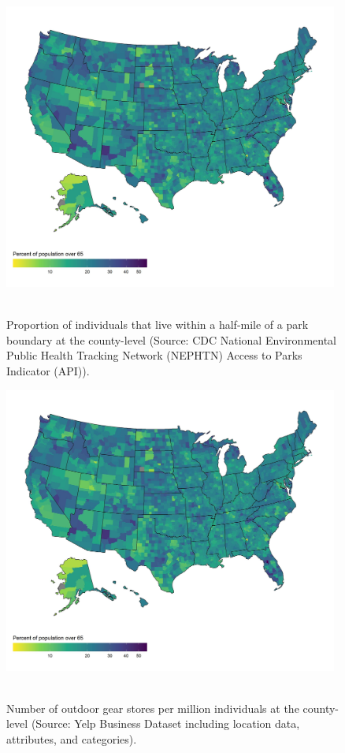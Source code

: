 \documentclass{article}
\begin{document}
\begin{figure}[!h] 
    \centering
    \caption{Proportion of individuals that live within a half-mile of a park boundary at the county-level (Source: CDC National Environmental Public Health Tracking Network (NEPHTN) Access to Parks Indicator (API)).}
    \includegraphics[width=11cm]{figures/univariate/figU05_api.jpg}
    \
\end{figure}
\FloatBarrier

\begin{figure}[!h] 
    \centering
    \caption{Number of outdoor gear stores per million individuals at the county-level (Source: Yelp Business Dataset including location data, attributes, and categories).}
    \includegraphics[width=11cm]{figures/univariate/figU06_n_businesses_permil.jpg}
    \
\end{figure}
\FloatBarrier
\end{document}
